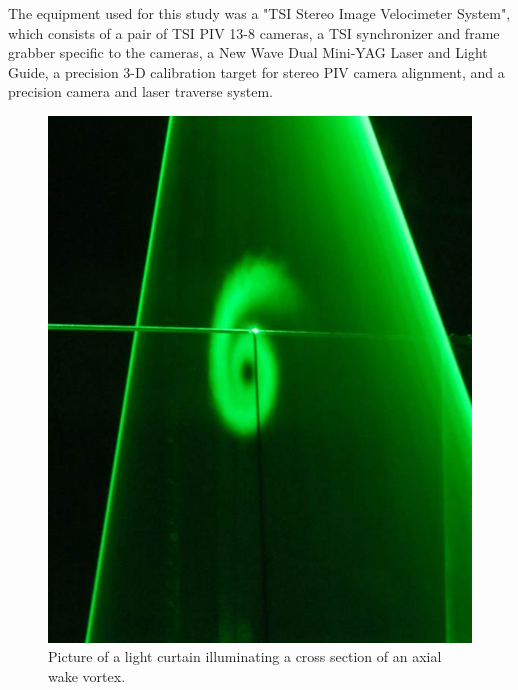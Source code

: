 The equipment used for this study was a "TSI Stereo Image Velocimeter System", 
which consists of a pair of TSI PIV 13-8 cameras, a TSI synchronizer and frame 
grabber specific to the cameras, a New Wave Dual Mini-YAG Laser and Light 
Guide, a precision 3-D calibration target for stereo PIV camera alignment, and 
a precision camera and laser traverse system.

\begin{figure}[H]
	\centering
	\includegraphics[width=5in]{figs/piv_method/laser_sheet_picture}
	\caption{Picture of a light curtain illuminating a cross section of an 
	axial wake vortex.}
	\label{fig:laser_sheet_picture}
\end{figure}


